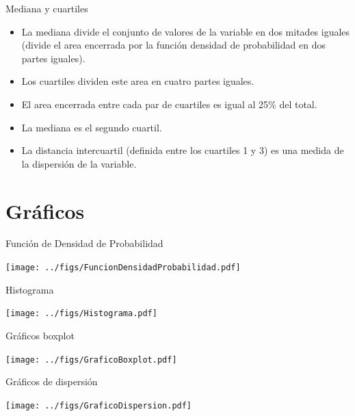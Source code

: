 \documentclass[aspectratio=169, usenames,svgnames,dvipsnames]{beamer}
\begin{document}
\begin{frame}[label={sec:org3ac4587}]{Mediana y cuartiles}
\begin{itemize}
\item La \alert{mediana} divide el conjunto de valores de la variable en \alert{dos
mitades} iguales (divide el area encerrada por la función densidad
de probabilidad en dos partes iguales).
\item Los \alert{cuartiles} dividen este area en \alert{cuatro} partes iguales.
\item El area encerrada entre cada par de cuartiles es igual al 25\% del total.
\item La \alert{mediana} es el \alert{segundo cuartil}.
\item La \alert{distancia intercuartil} (definida entre los cuartiles 1 y 3) es
una \alert{medida de la dispersión} de la variable.
\end{itemize}
\end{frame}


\section{Gráficos}
\label{sec:org85c3f77}


\begin{frame}[label={sec:orgcae4919}]{Función de Densidad de Probabilidad}
\begin{center}
\texttt{[image: ../figs/FuncionDensidadProbabilidad.pdf]}
\end{center}
\end{frame}

\begin{frame}[label={sec:org8ae07e8}]{Histograma}
\begin{center}
\texttt{[image: ../figs/Histograma.pdf]}
\end{center}
\end{frame}


\begin{frame}[label={sec:org4e0595c}]{Gráficos boxplot}
\begin{center}
\texttt{[image: ../figs/GraficoBoxplot.pdf]}
\end{center}
\end{frame}


\begin{frame}[label={sec:orgd2565d8}]{Gráficos de dispersión}
\begin{center}
\texttt{[image: ../figs/GraficoDispersion.pdf]}
\end{center}
\end{frame}
\end{document}
